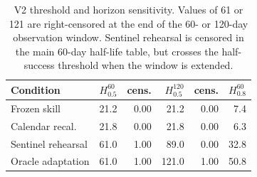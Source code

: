 \begin{table}[t]
\centering
\caption{V2 threshold and horizon sensitivity. Values of 61 or 121 are right-censored at the end of the 60- or 120-day observation window. Sentinel rehearsal is censored in the main 60-day half-life table, but crosses the half-success threshold when the window is extended.}
\label{tab:threshold-sensitivity}
\small
\begin{tabular}{@{}lrrrrr@{}}
\toprule
Condition & $H_{0.5}^{60}$ & cens. & $H_{0.5}^{120}$ & cens. & $H_{0.8}^{60}$ \\
\midrule
Frozen skill & 21.2 & 0.00 & 21.2 & 0.00 & 7.4 \\
Calendar recal. & 21.8 & 0.00 & 21.8 & 0.00 & 6.3 \\
Sentinel rehearsal & 61.0 & 1.00 & 89.0 & 0.00 & 32.8 \\
Oracle adaptation & 61.0 & 1.00 & 121.0 & 1.00 & 50.8 \\
\bottomrule
\end{tabular}
\end{table}
